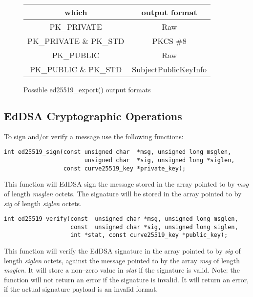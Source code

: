 \documentclass[synpaper]{book}
\begin{document}
\begin{figure}[H]
\begin{center}
\begin{tabular}{|c|c|}
\hline \textbf{which} & \textbf{output format} \\
\hline PK\_PRIVATE & Raw \\
\hline PK\_PRIVATE \& PK\_STD & PKCS \#8 \\
\hline PK\_PUBLIC & Raw \\
\hline PK\_PUBLIC \& PK\_STD & SubjectPublicKeyInfo \\
\hline
\end{tabular}
\end{center}
\caption{Possible ed25519\_export() output formats}
\end{figure}

\subsection{EdDSA Cryptographic Operations}

To sign and/or verify a message use the following functions:

\begin{verbatim}
int ed25519_sign(const unsigned char  *msg, unsigned long msglen,
                       unsigned char  *sig, unsigned long *siglen,
                 const curve25519_key *private_key);
\end{verbatim}

This function will EdDSA sign the message stored in the array pointed to by \textit{msg} of length \textit{msglen} octets.  The signature
will be stored in the array pointed to by \textit{sig} of length \textit{siglen} octets.

\begin{verbatim}
int ed25519_verify(const  unsigned char *msg, unsigned long msglen,
                   const  unsigned char *sig, unsigned long siglen,
                   int *stat, const curve25519_key *public_key);
\end{verbatim}

This function will verify the EdDSA signature in the array pointed to by \textit{sig} of length \textit{siglen} octets, against the message
pointed to by the array \textit{msg} of length \textit{msglen}. It will store a non--zero value in \textit{stat} if the signature is valid.  Note:
the function will not return an error if the signature is invalid. It will return an error, if the actual signature payload is an invalid format.
\end{document}
